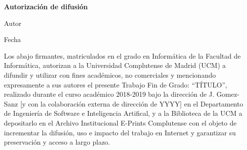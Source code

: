 
\newpage

\thispagestyle{empty}

\begin{center}

{\bf \Huge Autorización de difusión}

\vspace{1cm}


   \large Autor\\

   \vspace{0.5cm}


   Fecha\\

   \vspace{0.5cm}
   \end{center}
   
Los abajo firmantes, matriculados en el grado en Informática de la Facultad de Informática, autorizan a la Universidad Complutense de Madrid (UCM) a difundir y utilizar con fines académicos, no comerciales y mencionando expresamente a sus autores el presente Trabajo Fin de Grado: “TÍTULO”, realizado durante el curso académico 2018-2019 bajo la dirección de J. Gomez-Sanz [y con la colaboración externa de dirección de YYYY] en el Departamento de Ingeniería de Software e Inteligencia Artifical, y a la Biblioteca de la UCM a depositarlo en el Archivo Institucional E-Prints Complutense con el objeto de incrementar la difusión, uso e impacto del trabajo en Internet y garantizar su preservación y acceso a largo plazo.

